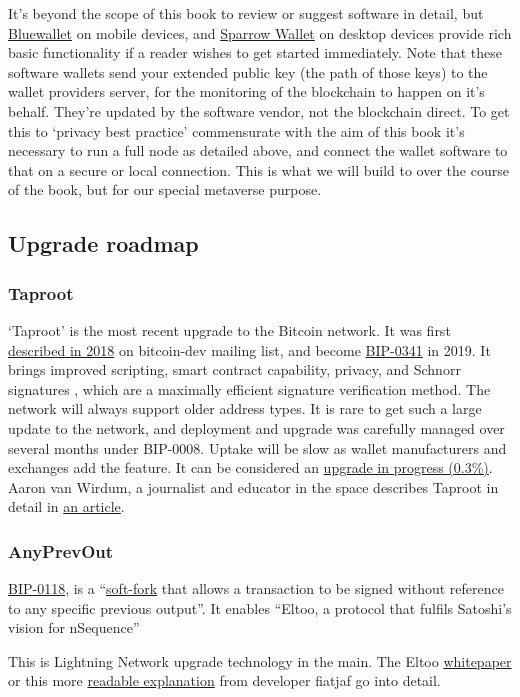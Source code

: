 It's beyond the scope of this book to review or suggest software in detail, but \href{https://bluewallet.io/}{Bluewallet} on mobile devices, and \href{https://sparrowwallet.com/}{Sparrow Wallet} on desktop devices provide rich basic functionality if a reader wishes to get started immediately. Note that these software wallets send your extended public key (the path of those keys) to the wallet providers server, for the monitoring of the blockchain to happen on it's behalf. They're updated by the software vendor, not the blockchain direct. To get this to `privacy best practice' commensurate with the aim of this book it's necessary to run a full node as detailed above, and connect the wallet software to that on a secure or local connection. This is what we will build to over the course of the book, but for our special metaverse purpose. 
\subsection{Upgrade roadmap}
\subsubsection{Taproot}
`Taproot' is the most recent upgrade to the Bitcoin network. It was first \href{https://lists.linuxfoundation.org/pipermail/bitcoin-dev/2018-January/015614.html}{described in 2018} on bitcoin-dev mailing list, and become \href{https://github.com/bitcoin/bips/blob/master/bip-0341.mediawiki}{BIP-0341} in 2019. It brings improved scripting, smart contract capability, privacy, and Schnorr signatures \cite{schnorr1989efficient}, which are a maximally efficient signature verification method. The network will always support older address types. It is rare to get such a large update to the network, and deployment and upgrade was carefully managed over several months under BIP-0008. Uptake will be slow as wallet manufacturers and exchanges add the feature. It can be considered an \href{https://transactionfee.info/charts/transactions-spending-taproot/}{upgrade in progress (0.3\%)}. Aaron van Wirdum, a journalist and educator in the space describes Taproot in detail in \href{https://bitcoinmagazine.com/technical/taproot-coming-what-it-and-how-it-will-benefit-bitcoin}{an article}.\par
\subsubsection{AnyPrevOut}
\href{https://anyprevout.xyz}{BIP-0118}, is a ``\href{https://en.bitcoin.it/wiki/Softfork}{soft-fork} that allows a transaction to be signed without reference to any specific previous output''. It enables ``Eltoo, a protocol that fulfils Satoshi's vision for nSequence''\par
This is Lightning Network upgrade technology in the main. The Eltoo \href{https://blockstream.com/eltoo.pdf}{whitepaper} or this more \href{https://fiatjaf.alhur.es/ffdfe772.html}{readable explanation} from developer fiatjaf go into detail.\par 
